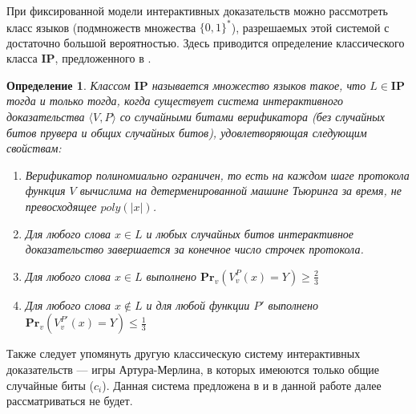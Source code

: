 \documentclass[14pt, a4paper, russian]{report}
\newtheorem{definition}{\indent Определение}
\newcommand{\word}{\{0, 1\}^*}
\newcommand{\poly}{\textit{poly}}
\newcommand{\pr}[2]{\textbf{Pr}_{#1}\left(#2\right)}
\begin{document}
При фиксированной модели интерактивных доказательств можно рассмотреть класс языков (подмножеств множества $\word$), разрешаемых этой системой с достаточно большой вероятностью. Здесь приводится определение классического класса $\textbf{IP}$, предложенного в \cite{goldwasser1989ip}.
\begin{definition}\label{ip}
    Классом $\textbf{IP}$ называется множество языков такое, что $L \in \textbf{IP}$ тогда и только тогда, когда существует система интерактивного доказательства $\langle V, P\rangle$ со случайными битами верификатора (без случайных битов прувера и общих случайных битов), удовлетворяющая следующим свойствам:
    \begin{enumerate}
        \item Верификатор полиномиально ограничен, то есть на каждом шаге протокола функция $V$ вычислима на детерменированной машине Тьюринга за время, не превосходящее $\poly(|x|)$.
        \item Для любого слова $x \in L$ и любых случайных битов интерактивное доказательство завершается за конечное число строчек протокола.
        \item Для любого слова $x \in L$ выполнено $\pr{v}{V^P_{v}(x) = Y} \geq \frac{2}{3}$
        \item Для любого слова $x \notin L$ и для любой функции $P'$ выполнено\\$\pr{v}{V^{P'}_{v}(x) = Y} \leq \frac{1}{3}$
    \end{enumerate}
\end{definition}
Также следует упомянуть другую классическую систему интерактивных доказательств --- игры Артура-Мерлина, в которых имеюются только общие случайные биты ($c_{i}$). Данная система предложена в \cite{babai1988arthur} и в данной работе далее рассматриваться не будет.
\end{document}
